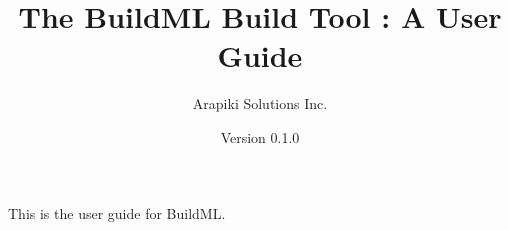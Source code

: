 \documentclass{article}
\title{The BuildML Build Tool : A User Guide}
\author{Arapiki Solutions Inc.}
\date{Version 0.1.0}
\begin{document}
\maketitle

This is the user guide for BuildML.
\end{document}
